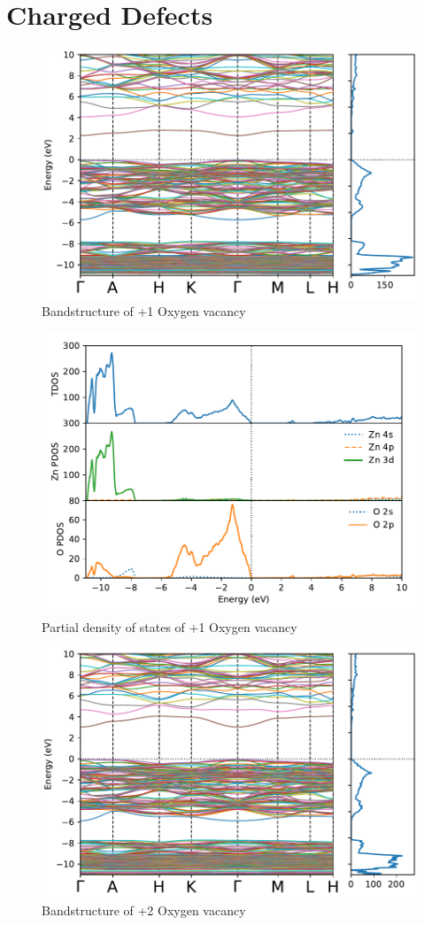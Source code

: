 \clearpage
\section{Charged Defects}
\begin{figure}[tbh!]
	\centering
	\includegraphics[width=0.7\linewidth]{"images/rnd/band-dos_O_vac-p1"}
	\caption[Bandstructure of +1 Oxygen vacancy]{Bandstructure of +1 Oxygen vacancy}
\end{figure}

\begin{figure}[tbh!]
	\centering
	\includegraphics[width=0.7\linewidth]{"images/rnd/dos-pdos_O_vac-p1"}
	\caption[Partial density of states of +1 Oxygen vacancy]{Partial density of states of +1 Oxygen vacancy}
\end{figure}

\begin{figure}[tbh!]
	\centering
	\includegraphics[width=0.7\linewidth]{"images/rnd/band-dos_O_vac-p2"}
	\caption[Bandstructure of +2 Oxygen vacancy]{Bandstructure of +2 Oxygen vacancy}
\end{figure}

